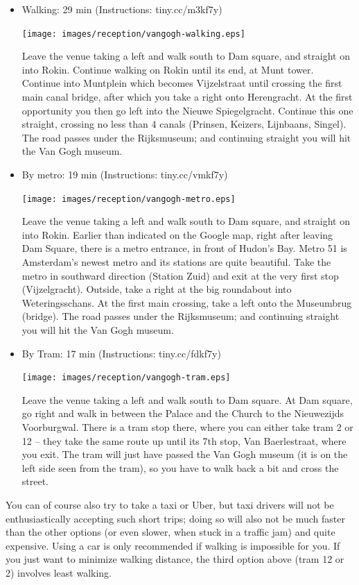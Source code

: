 \begin{itemize}
\item Walking: 29 min (Instructions: tiny.cc/m3kf7y)

\texttt{[image: images/reception/vangogh-walking.eps]} 

Leave the venue taking a left and walk south to Dam square, and straight on into Rokin. Continue walking on Rokin until its end, at Munt tower. Continue into Muntplein which becomes Vijzelstraat until crossing the first main canal bridge, after which you take a right onto Herengracht. At the first opportunity you then go left into the Nieuwe Spiegelgracht. Continue this one straight, crossing no less than 4 canals (Prinsen, Keizers, Lijnbaans, Singel). The road passes under the Rijksmuseum; and continuing straight you will hit the Van Gogh museum.

\item By metro: 19 min (Instructions: tiny.cc/vmkf7y)

\texttt{[image: images/reception/vangogh-metro.eps]}

Leave the venue taking a left and walk south to Dam square, and straight on into Rokin. Earlier than indicated on the Google map, right after leaving Dam Square, there is a metro entrance, in front of Hudon's Bay. Metro 51 is Amsterdam's newest metro and its stations are quite beautiful. Take the metro in southward direction (Station Zuid) and exit at the very first stop (Vijzelgracht). Outside, take a right at the big roundabout into Weteringsschans. At the first main crossing, take a left onto the Museumbrug (bridge). The road passes under the Rijksmuseum; and continuing straight you will hit the Van Gogh museum.

\item By Tram: 17 min (Instructions: tiny.cc/fdkf7y)

\texttt{[image: images/reception/vangogh-tram.eps]}

Leave the venue taking a left and walk south to Dam square. At Dam square, go right and walk in between the Palace and the Church to the Nieuwezijds Voorburgwal. There is a tram stop there, where you can either take tram 2 or 12  -- they take the same route up until its 7th stop, Van Baerlestraat, where you exit. The tram will just have passed the Van Gogh museum (it is on the left side seen from the tram), so you have to walk back a bit and cross the street.
\end{itemize}

You can of course also try to take a taxi or Uber, but taxi drivers will not be enthusiastically accepting such short trips; doing so will also not be much faster than the other options (or even slower, when stuck in a traffic jam) and quite expensive. Using a car is only recommended if walking is impossible for you. If you just want to minimize walking distance, the third option above (tram 12 or 2) involves least walking.
